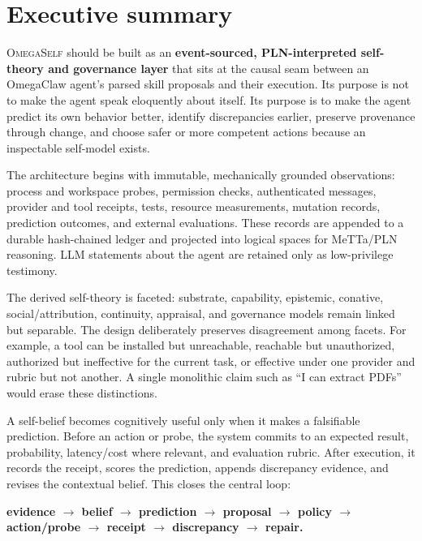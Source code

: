 \documentclass[11pt,oneside]{report}
\newcommand{\systemname}{\textsc{OmegaSelf}}
\begin{document}
\tableofcontents
\clearpage
\listoffigures
\clearpage
\listoftables
\clearpage

\chapter*{Executive summary}

\systemname{} should be built as an \textbf{event-sourced, PLN-interpreted self-theory and governance layer} that sits at the causal seam between an OmegaClaw agent's parsed skill proposals and their execution. Its purpose is not to make the agent speak eloquently about itself. Its purpose is to make the agent predict its own behavior better, identify discrepancies earlier, preserve provenance through change, and choose safer or more competent actions because an inspectable self-model exists.

The architecture begins with immutable, mechanically grounded observations: process and workspace probes, permission checks, authenticated messages, provider and tool receipts, tests, resource measurements, mutation records, prediction outcomes, and external evaluations. These records are appended to a durable hash-chained ledger and projected into logical spaces for MeTTa/PLN reasoning. LLM statements about the agent are retained only as low-privilege testimony.

The derived self-theory is faceted: substrate, capability, epistemic, conative, social/attribution, continuity, appraisal, and governance models remain linked but separable. The design deliberately preserves disagreement among facets. For example, a tool can be installed but unreachable, reachable but unauthorized, authorized but ineffective for the current task, or effective under one provider and rubric but not another. A single monolithic claim such as ``I can extract PDFs'' would erase these distinctions.

A self-belief becomes cognitively useful only when it makes a falsifiable prediction. Before an action or probe, the system commits to an expected result, probability, latency/cost where relevant, and evaluation rubric. After execution, it records the receipt, scores the prediction, appends discrepancy evidence, and revises the contextual belief. This closes the central loop:

\begin{center}
\textbf{evidence $\rightarrow$ belief $\rightarrow$ prediction $\rightarrow$ proposal $\rightarrow$ policy $\rightarrow$ action/probe $\rightarrow$ receipt $\rightarrow$ discrepancy $\rightarrow$ repair.}
\end{center}
\end{document}
